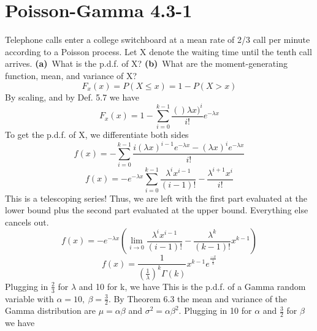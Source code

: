 \documentclass[12pt]{article}
\begin{document}
	\section[20pt]{Poisson-Gamma 4.3-1}
	Telephone calls enter a college switchboard at a mean rate of 2/3 call per minute according to a Poisson process. Let X denote the waiting time until the tenth call arrives. \newline
	\textbf{(a)}\ What is the p.d.f. of X? \newline
	\textbf{(b)}\ What are the moment-generating function, mean, and variance of X?
	\[F_x(x)=P(X\leq x)=1-P(X>x)\]
	By scaling, and by Def. 5.7 we have
	\[F_x(x)=1-\sum_{i=0}^{k-1}\frac{()\lambda x)^i}{i!}e^{-\lambda x}\]
	To get the p.d.f. of X, we differentiate both sides
	\[f(x)=-\sum_{i=0}^{k-1}\frac{i(\lambda x)^{i-1}e^{-\lambda x}-(\lambda x)^{i}e^{-\lambda x}}{i!}\]
	\[f(x)=-e^{-\lambda x}\sum_{i=0}^{k-1}\frac{\lambda ^ix^{i-1}}{(i-1)!}-\frac{\lambda ^{i+1}x^i}{i!}\]
	This is a telescoping series! Thus, we are left with the first part evaluated at the lower bound plus the second part evaluated at the upper bound. Everything else cancels out.
	\[f(x)=-e^{-\lambda x}\left(\lim_{i \rightarrow 0}\frac{\lambda^ix^{i-1}}{(i-1)!}-\frac{\lambda ^k}{(k-1)!}x^{k-1}\right)\]
	\[f(x)=\frac{1}{\left(\frac{1}{\lambda}\right)^k\Gamma(k)}x^{k-1}e^{\frac{-x}{\frac{1}{\lambda}}}\]
	Plugging in \(\frac{2}{3}\) for \(\lambda\) and 10 for k, we have \newline
	 \newline \newline
	This is the p.d.f. of a Gamma random variable with \(\alpha=10,\ \beta = \frac{3}{2}\).
	\newline
	By Theorem 6.3 the mean and variance of the Gamma distribution are \(\mu=\alpha\beta\) and \(\sigma^2=\alpha\beta^2\). \newline \newline
	Plugging in 10 for \(\alpha\) and \(\frac{3}{2}\) for \(\beta\) we have \newline
	\newpage
\end{document}
